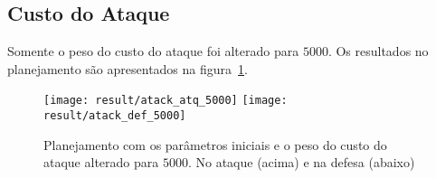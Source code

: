 \subsection{Custo do Ataque}
Somente o peso do custo do ataque foi alterado para $5000$.
Os resultados no planejamento são apresentados na
figura~\ref{fig:atack_5000}.

\begin{figure}[H]
  \centering
  \texttt{[image: result/atack\_atq\_5000]}
  \texttt{[image: result/atack\_def\_5000]}
  \caption{Planejamento com os parâmetros iniciais e o peso do
           custo do ataque alterado para $5000$.
           No ataque (acima) e na defesa (abaixo)}\label{fig:atack_5000}
\end{figure}
